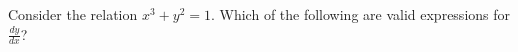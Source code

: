 \documentclass{ximera}
\author{Steven Gubkin}
\begin{document}
\begin{exercise}

Consider the relation $x^3+y^2 = 1$.  Which of the following are valid expressions for $\frac{dy}{dx}$?
\begin{selectAll}
\end{selectAll}
\end{exercise}
\end{document}
